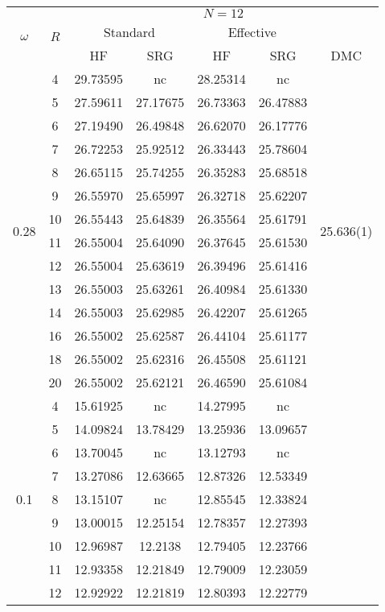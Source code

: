 \begin{table}
\begin{center}
\tabcolsep=0.35cm
\begin{tabular}{|c|c|c|c|c|c|c|}
\hline
\multirow{3}{*}{$\omega$} & \multirow{3}{*}{$R$} & \multicolumn{5}{|c|}{$N=12$} \\
& & \multicolumn{2}{|c|}{Standard} & \multicolumn{2}{|c|}{Effective} &  \\
& & HF & SRG & HF & SRG & DMC \\
\hline\hline
\multirow{14}{*}{0.28} & 4&29.73595 & nc&28.25314 &nc & \multirow{14}{*}{25.636(1)} \\ %
& 5&27.59611 &27.17675 &26.73363 &26.47883 & \\
& 6&27.19490 &26.49848 &26.62070 &26.17776 & \\
& 7&26.72253 &25.92512 &26.33443 &25.78604 & \\
& 8&26.65115 &25.74255 &26.35283 &25.68518 & \\
& 9&26.55970 &25.65997 &26.32718 &25.62207 & \\
& 10&26.55443 &25.64839 & 26.35564 &25.61791 & \\
& 11&26.55004 &25.64090 &26.37645 &25.61530 & \\
& 12&26.55004 &25.63619 &26.39496 &25.61416 & \\ 
& 13&26.55003 &25.63261 &26.40984 &25.61330 & \\ 
&14 &26.55003 &25.62985 &26.42207 &25.61265 & \\
&16 &26.55002 &25.62587 &26.44104 &25.61177 & \\
& 18&26.55002& 25.62316& 26.45508& 25.61121& \\
& 20&26.55002 &25.62121 &26.46590 &25.61084 & \\
\hline
\multirow{14}{*}{0.1} & 4&15.61925 & nc&14.27995 &nc & \multirow{14}{*}{} \\
& 5&14.09824 &13.78429 &13.25936 &13.09657 & \\
& 6&13.70045 &nc & 13.12793 & nc& \\
& 7&13.27086 &12.63665 &12.87326 &12.53349 & \\
& 8&13.15107 &nc &12.85545 &12.33824 & \\
& 9&13.00015 &12.25154 & 12.78357 &12.27393 & \\
& 10&12.96987 &12.2138 & 12.79405 &12.23766 & \\
& 11&12.93358 &12.21849 &12.79009 & 12.23059 & \\
& 12&12.92922 &12.21819 &12.80393 &12.22779 & \\

\end{tabular}
\end{center}
\end{table}
